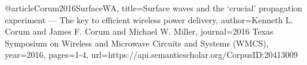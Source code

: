 @article{Corum2016SurfaceWA,
  title={Surface waves and the ‘crucial’ propagation experiment — The key to efficient wireless power delivery},
  author={Kenneth L. Corum and James F. Corum and Michael W. Miller},
  journal={2016 Texas Symposium on Wireless and Microwave Circuits and Systems (WMCS)},
  year={2016},
  pages={1-4},
  url={https://api.semanticscholar.org/CorpusID:20413009}
}